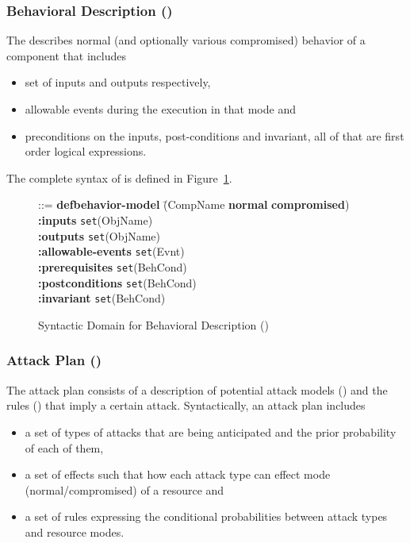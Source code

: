 \documentclass[conference]{IEEEtran}
\begin{document}
\subsubsection*{Behavioral Description ()}
The  describes normal (and optionally various compromised) behavior of a component that includes
\begin{itemize}
\item  set of inputs and outputs respectively,
\item  allowable events during the execution in that mode and
\item  preconditions on the inputs, post-conditions and invariant, all of that are first order logical expressions.
\end{itemize}
The complete syntax of  is defined in Figure~\ref{fig:behave}.
\begin{figure}
\begin{tabbing}
 ::= \textbf{defbehavior-model} \=(CompName \textbf{normal}  \textbf{compromised})
\\\> \textbf{:inputs} \hspace*{1.5cm} \texttt{set}(ObjName)
\\\> \textbf{:outputs} \hspace*{1.3cm} \texttt{set}(ObjName)
\\\> \textbf{:allowable-events}  \hspace*{0.1cm} \texttt{set}(Evnt)
\\\> \textbf{:prerequisites} \hspace*{0.6cm} \texttt{set}(BehCond)
\\\> \textbf{:postconditions} \hspace*{0.4cm} \texttt{set}(BehCond)
\\\> \textbf{:invariant} \hspace*{1.1cm} \texttt{set}(BehCond)
\end{tabbing}
\caption{Syntactic Domain for Behavioral Description ()}
\label{fig:behave}
\end{figure}

\subsubsection*{Attack Plan ()}
The attack plan  consists of a description of potential attack models () and the rules () that imply a certain attack.  Syntactically, an attack plan includes
\begin{itemize}
\item a set of types of attacks that are being anticipated and the prior probability of each of them,
\item a set of effects such that how each attack type can effect mode (normal/compromised) of a resource and
\item a set of rules expressing the conditional probabilities between attack types and resource modes.
\end{itemize}
\end{document}
